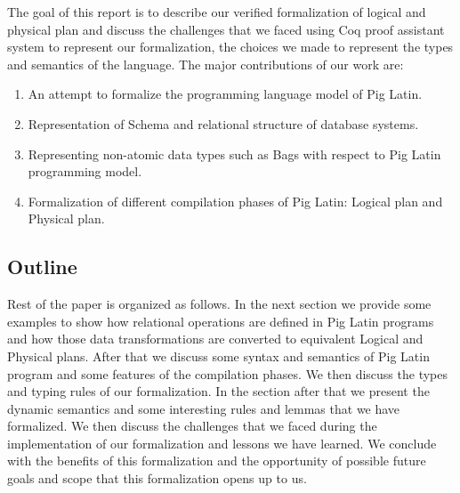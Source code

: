 The goal of this report is to describe our verified formalization of logical and physical plan and discuss the challenges that we faced using Coq proof assistant system to represent our formalization, the choices we made to represent the types and semantics of the language.
The major contributions of our work are:
\begin{enumerate}
	\item An attempt to formalize the programming language model of Pig Latin.
	\item Representation of Schema and relational structure of database systems.
	\item Representing non-atomic data types such as Bags with respect to Pig Latin programming model.
	\item Formalization of different compilation phases of Pig Latin: Logical plan and Physical plan.
\end{enumerate}

\subsection{Outline}
\label{subsec:outline}

Rest of the paper is organized as follows. In the next section we provide some examples to show how relational operations are defined in Pig Latin programs and how those data transformations are converted to equivalent Logical and Physical plans. After that we discuss some syntax and semantics of Pig Latin program and some features of the compilation phases. We then discuss the types and typing rules of our formalization. In the section after that 
we present the dynamic semantics and some interesting rules and lemmas that we have formalized. We then discuss the challenges that we faced during the implementation of our formalization and lessons we have learned. We conclude with the benefits of this formalization and the opportunity of possible future goals and scope that this formalization opens up to us.




